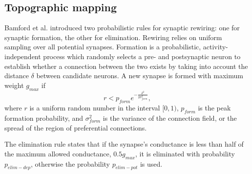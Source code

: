 \documentclass{article}
\begin{document}
\subsection{Topographic mapping}

Bamford et al. \cite{bamford2010synaptic} introduced two probabilistic rules for synaptic rewiring: one for synaptic formation, the other for elimination.
Rewiring relies on uniform sampling over all potential synapses. 
Formation is a probabilistic, activity-independent
process which randomly selects a pre- and postsynaptic neuron to establish whether a connection between the two exists by taking into account the distance $\delta$ between candidate neurons. 
A new synapse is formed with maximum weight $g_{max}$ if
%
\begin{equation} \label{eq:formation_rule}
r<p_{form}e^{-\frac{\delta^2}{2\sigma^2_{form}}},
\end{equation}
%
where $r$ is a uniform random number in the interval $[0, 1)$, $p_{form}$ is the peak formation probability, and $\sigma^2_{form}$ is the variance of the connection field, or the spread of the region of preferential connections.

The elimination rule states that if the synapse's conductance is less than half of the maximum allowed conductance, $0.5g_{max}$, it is eliminated with probability $p_{elim-dep}$, otherwise the probability $p_{elim-pot}$ is used.
\end{document}
